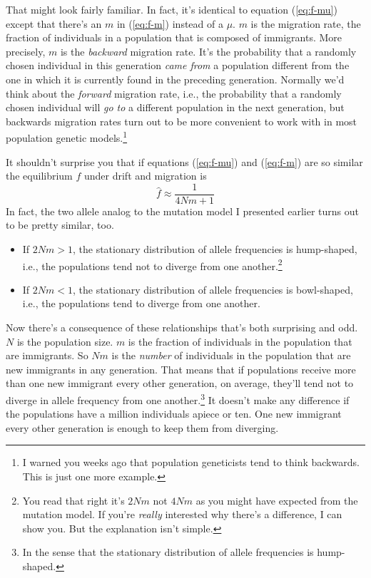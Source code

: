 \documentclass[12pt]{article}
\begin{document}
That might look fairly familiar. In fact, it's identical to equation
(\ref{eq:f-mu}) except that there's an $m$ in (\ref{eq:f-m}) instead
of a $\mu$. $m$ is the migration rate, the fraction of individuals in
a population that is composed of immigrants. More precisely, $m$ is
the {\it backward\/} migration rate.
It's the probability that a randomly chosen individual in this
generation {\it came from\/} a population different from the one in
which it is currently found in the preceding generation. Normally we'd
think about the {\it forward\/} migration rate, i.e., the probability that a randomly chosen
individual will {\it go to\/} a different population in the next
generation, but backwards migration rates turn out to be more
convenient to work with in most population genetic models.\footnote{I
  warned you weeks ago that population geneticists tend to think
  backwards. This is just one more example.}

It shouldn't surprise you that if equations (\ref{eq:f-mu}) and
(\ref{eq:f-m}) are so similar the equilibrium $f$ under drift and
migration is
\[
\hat f \approx \frac{1}{4Nm + 1}
\]
In fact, the two allele analog to the mutation model I presented
earlier turns out to be pretty similar, too.

\begin{itemize}

\item If $2Nm > 1$, the stationary distribution of allele frequencies
is hump-shaped, i.e., the populations tend not to diverge from one
another.\footnote{You read that right it's $2Nm$ not $4Nm$ as you
might have expected from the mutation model. If you're {\it really\/}
interested why there's a difference, I can show you. But the
explanation isn't simple.}

\item If $2Nm < 1$, the stationary distribution of allele frequencies
is bowl-shaped, i.e., the populations tend to diverge from one another.

\end{itemize}

Now there's a consequence of these relationships that's both
surprising and odd. $N$ is the population size. $m$ is the fraction of
individuals in the population that are immigrants. So $Nm$ is the {\it
  number\/} of individuals in the population that are new immigrants
in any generation. That means that if populations receive more than
one new immigrant every other generation, on average, they'll tend not
to diverge in allele frequency from one another.\footnote{In the sense
  that the stationary distribution of allele frequencies is
  hump-shaped.} It doesn't make any difference if the populations have
a million individuals apiece or ten. One new immigrant every other
generation is enough to keep them from diverging.
\end{document}
